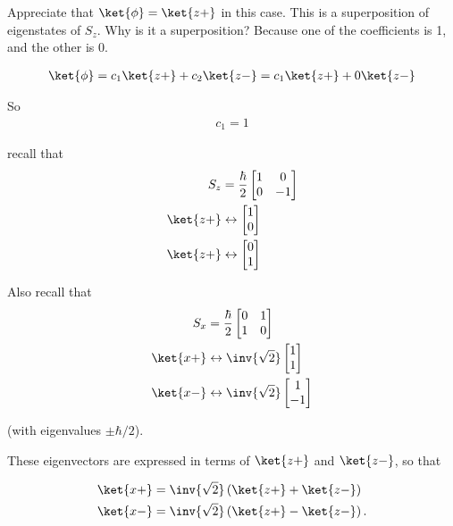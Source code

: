 Appreciate that $\ket{\phi} = \ket{z+}$ in this case.  This is a superposition of eigenstates of $S_z$.  Why is it a superposition?  Because one of the coefficients is 1, and the other is 0.

\begin{align}\label{eqn:PHY356Foct26:106}
\ket{\phi}
=
 c_1 \ket{z+}
+ c_2 \ket{z-}
=
 c_1 \ket{z+}
+ 0 \ket{z-}
\end{align}

So
\begin{align}\label{eqn:PHY356Foct26:107}
c_1 = 1
\end{align}

recall that
\begin{align}\label{eqn:PHY356Foct26:108}
S_z &= \frac{\hbar}{2}
\begin{bmatrix}
1 & 0 \\
0 & -1
\end{bmatrix} \\
\ket{z+} &\leftrightarrow
\begin{bmatrix}
1 \\
0
\end{bmatrix} \\
\ket{z+} &\leftrightarrow
\begin{bmatrix}
0 \\
1
\end{bmatrix}
\end{align}

Also recall that
\begin{align}\label{eqn:PHY356Foct26:109}
S_x &= \frac{\hbar}{2}
\begin{bmatrix}
0 & 1 \\
1 & 0
\end{bmatrix} \\
\ket{x+} &\leftrightarrow
\inv{\sqrt{2}}
\begin{bmatrix}
1 \\
1
\end{bmatrix} \\
\ket{x-} &\leftrightarrow
\inv{\sqrt{2}}
\begin{bmatrix}
1 \\
-1
\end{bmatrix}
\end{align}

(with eigenvalues $\pm\hbar/2$).

These eigenvectors are expressed in terms of $\ket{z+}$ and $\ket{z-}$, so that

\begin{align}\label{eqn:PHY356Foct26:110}
\ket{x+}
&=
\inv{\sqrt{2}} \left( \ket{z+} + \ket{z-} \right) \\
\ket{x-}
&=
\inv{\sqrt{2}} \left( \ket{z+} - \ket{z-} \right) .
\end{align}

